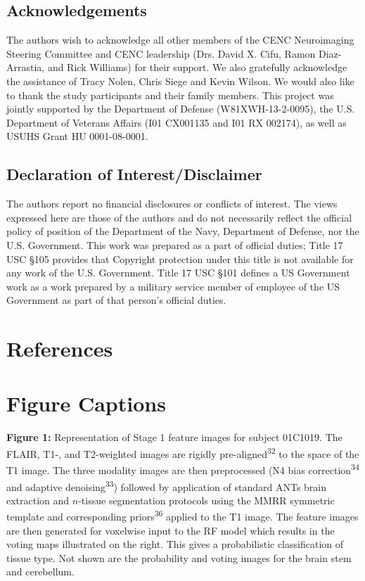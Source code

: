 \documentclass[11pt,]{article}
\begin{document}
\clearpage

\subsection{Acknowledgements}\label{acknowledgements}

The authors wish to acknowledge all other members of the CENC
Neuroimaging Steering Committee and CENC leadership (Drs. David X. Cifu,
Ramon Diaz-Arrastia, and Rick Williams) for their support. We also
gratefully acknowledge the assistance of Tracy Nolen, Chris Siege and
Kevin Wilson. We would also like to thank the study participants and
their family members. This project was jointly supported by the
Department of Defense (W81XWH-13-2-0095), the U.S. Department of
Veterans Affairs (I01 CX001135 and I01 RX 002174), as well as USUHS
Grant HU 0001-08-0001.

\subsection{Declaration of
Interest/Disclaimer}\label{declaration-of-interestdisclaimer}

The authors report no financial disclosures or conflicts of interest.
The views expressed here are those of the authors and do not necessarily
reflect the official policy of position of the Department of the Navy,
Department of Defense, nor the U.S. Government. This work was prepared
as a part of official duties; Title 17 USC §105 provides that Copyright
protection under this title is not available for any work of the U.S.
Government. Title 17 USC §101 defines a US Government work as a work
prepared by a military service member of employee of the US Government
as part of that person's official duties.

\clearpage

\section{References}\label{references}

\section{Figure Captions}\label{figure-captions}

\textbf{Figure 1:} Representation of Stage 1 feature images for subject
01C1019. The FLAIR, T1-, and T2-weighted images are rigidly
pre-aligned\textsuperscript{32} to the space of the T1 image. The three
modality images are then preprocessed (N4 bias
correction\textsuperscript{34} and adaptive
denoising\textsuperscript{33}) followed by application of standard ANTs
brain extraction and \(n\)-tissue segmentation protocols using the MMRR
symmetric template and corresponding priors\textsuperscript{36} applied
to the T1 image. The feature images are then generated for voxelwise
input to the RF model which results in the voting maps illustrated on
the right. This gives a probabilistic classification of tissue type. Not
shown are the probability and voting images for the brain stem and
cerebellum.
\end{document}
